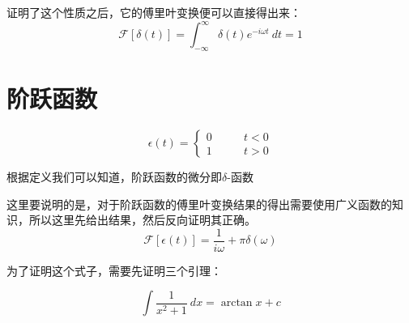         证明了这个性质之后，它的傅里叶变换便可以直接得出来：
        \begin{equation}
            \mathscr{F}[\delta(t)]=\int_{-\infty}^{\infty}\delta(t)e^{-i\omega t}\ dt=1
            \label{eq: 2.11}
        \end{equation}


    \section{阶跃函数}
        \begin{definition}
            \begin{equation}
                \epsilon(t)=\left\{
                \begin{aligned}
                0&\qquad t<0\\
                1&\qquad t>0
                \end{aligned}
                \right.
                \label{eq: 2.12}
            \end{equation}
        \end{definition}
        根据定义我们可以知道，阶跃函数的微分即$\delta$-函数

        这里要说明的是，对于阶跃函数的傅里叶变换结果的得出需要使用广义函数的知识，所以这里先给出结果，然后反向证明其正确。
        \begin{equation}
            \mathscr{F}[\epsilon(t)]=\dfrac{1}{i\omega}+\pi\delta(\omega)
            \label{eq: 2.13}
        \end{equation}
        
        为了证明这个式子，需要先证明三个引理：

        \begin{lemma}
            \begin{equation}
                \int \dfrac{1}{x^2 + 1}\ dx=\arctan x+c
                \label{eq: 2.14}
            \end{equation}
        \end{lemma}

